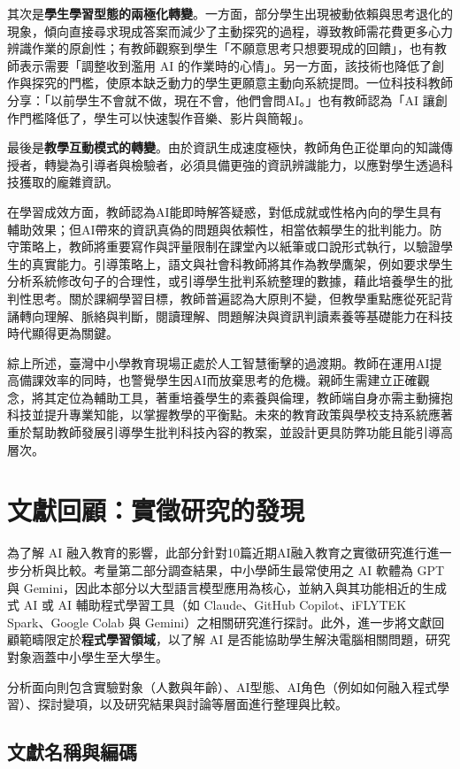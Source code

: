 其次是\textbf{學生學習型態的兩極化轉變}。一方面，部分學生出現被動依賴與思考退化的現象，傾向直接尋求現成答案而減少了主動探究的過程，導致教師需花費更多心力辨識作業的原創性；有教師觀察到學生「不願意思考只想要現成的回饋」，也有教師表示需要「調整收到濫用 AI 的作業時的心情」。另一方面，該技術也降低了創作與探究的門檻，使原本缺乏動力的學生更願意主動向系統提問。一位科技科教師分享：「以前學生不會就不做，現在不會，他們會問AI。」也有教師認為「AI 讓創作門檻降低了，學生可以快速製作音樂、影片與簡報」。

最後是\textbf{教學互動模式的轉變}。由於資訊生成速度極快，教師角色正從單向的知識傳授者，轉變為引導者與檢驗者，必須具備更強的資訊辨識能力，以應對學生透過科技獲取的龐雜資訊。

在學習成效方面，教師認為AI能即時解答疑惑，對低成就或性格內向的學生具有輔助效果；但AI帶來的資訊真偽的問題與依賴性，相當依賴學生的批判能力。防守策略上，教師將重要寫作與評量限制在課堂內以紙筆或口說形式執行，以驗證學生的真實能力。引導策略上，語文與社會科教師將其作為教學鷹架，例如要求學生分析系統修改句子的合理性，或引導學生批判系統整理的數據，藉此培養學生的批判性思考。關於課綱學習目標，教師普遍認為大原則不變，但教學重點應從死記背誦轉向理解、脈絡與判斷，閱讀理解、問題解決與資訊判讀素養等基礎能力在科技時代顯得更為關鍵。

綜上所述，臺灣中小學教育現場正處於人工智慧衝擊的過渡期。教師在運用AI提高備課效率的同時，也警覺學生因AI而放棄思考的危機。親師生需建立正確觀念，將其定位為輔助工具，著重培養學生的素養與倫理，教師端自身亦需主動擁抱科技並提升專業知能，以掌握教學的平衡點。未來的教育政策與學校支持系統應著重於幫助教師發展引導學生批判科技內容的教案，並設計更具防弊功能且能引導高層次。
\section{文獻回顧：實徵研究的發現}\label{sec:文獻回顧}

為了解 AI 融入教育的影響，此部分針對10篇近期AI融入教育之實徵研究進行進一步分析與比較。考量第二部分調查結果，中小學師生最常使用之 AI 軟體為 GPT 與 Gemini，因此本部分以大型語言模型應用為核心，並納入與其功能相近的生成式 AI 或 AI 輔助程式學習工具（如 Claude、GitHub Copilot、iFLYTEK Spark、Google Colab 與 Gemini）之相關研究進行探討。此外，進一步將文獻回顧範疇限定於\textbf{程式學習領域}，以了解 AI 是否能協助學生解決電腦相關問題，研究對象涵蓋中小學生至大學生。

分析面向則包含實驗對象（人數與年齡）、AI型態、AI角色（例如如何融入程式學習）、探討變項，以及研究結果與討論等層面進行整理與比較。

\subsection{文獻名稱與編碼}\label{sec:文獻名稱}

